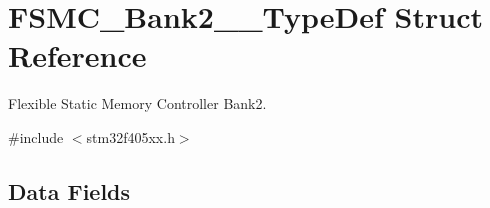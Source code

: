 \hypertarget{struct_f_s_m_c___bank2__3___type_def}{}\section{F\+S\+M\+C\+\_\+\+Bank2\+\_\+\_\+\+Type\+Def Struct Reference}
\label{struct_f_s_m_c___bank2__3___type_def}


Flexible Static Memory Controller Bank2.  




{\ttfamily \#include $<$stm32f405xx.\+h$>$}

\subsection*{Data Fields}
